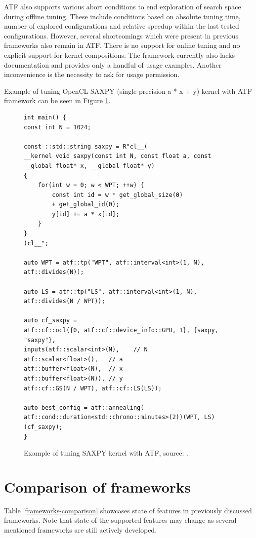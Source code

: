 \documentclass
[
    digital, %
    oneside, %
    table, %
    nolof, %
    nolot, %
    nocover %
]{fithesis3}
\begin{document}
ATF also supports various abort conditions to end exploration of search space during offline tuning. These include conditions based on absolute tuning
time, number of explored configurations and relative speedup within the last tested configurations. However, several shortcomings which were present
in previous frameworks also remain in ATF. There is no support for online tuning and no explicit support for kernel compositions. The framework currently
also lacks documentation and provides only a handful of usage examples. Another inconvenience is the necessity to ask for usage permission.

Example of tuning OpenCL SAXPY (single-precision a * x + y) kernel with ATF framework can be seen in Figure \ref{atf-example}.

\begin{figure}
\begin{adjustwidth}{-1cm}{-1cm}
\begin{lstlisting}
int main() {
const int N = 1024;

const ::std::string saxpy = R"cl__( 
__kernel void saxpy(const int N, const float a, const __global float* x, __global float* y)
{       
    for(int w = 0; w < WPT; ++w) {
        const int id = w * get_global_size(0) 
        + get_global_id(0);
        y[id] += a * x[id];
    }
}
)cl__";

auto WPT = atf::tp("WPT", atf::interval<int>(1, N), atf::divides(N));

auto LS = atf::tp("LS", atf::interval<int>(1, N), atf::divides(N / WPT));

auto cf_saxpy =
atf::cf::ocl({0, atf::cf::device_info::GPU, 1}, {saxpy, "saxpy"},
inputs(atf::scalar<int>(N),    // N
atf::scalar<float>(),   // a
atf::buffer<float>(N),  // x
atf::buffer<float>(N)), // y
atf::cf::GS(N / WPT), atf::cf::LS(LS));

auto best_config = atf::annealing(
atf::cond::duration<std::chrono::minutes>(2))(WPT, LS)(cf_saxpy);
}
\end{lstlisting}
\caption{Example of tuning SAXPY kernel with ATF, source: \cite{atf-example}.}
\label{atf-example}
\end{adjustwidth}
\end{figure}

\section{Comparison of frameworks}
Table \ref{frameworks-comparison} showcases state of features in previously discussed frameworks. Note that state of the supported features may change
as several mentioned frameworks are still actively developed.
\end{document}
